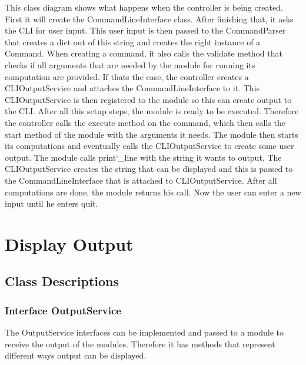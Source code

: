\documentclass[parskip=full]{scrartcl}
\begin{document}
\begin{figure}[h]
\begin{center}

\label{Controller Sequence Diagram}
\end{center}
\end{figure}
\newpage

This class diagram shows what happens when the controller is being created.
First it will create the CommandLineInterface class.
After finishing that, it asks the \gls{CLI} for user input.
This user input is then passed to the CommandParser that creates a dict out of this string and creates the right instance of a Command.
When creating a command, it also calls the validate method that checks if all arguments that are needed by the module for running its computation are provided.
If thats the case, the controller creates a CLIOutputService and attaches the CommandLineInterface to it.
This CLIOutputService is then registered to the module so this can create output to the \gls{CLI}.
After all this setup steps, the module is ready to be executed.
Therefore the controller calls the execute method on the command, which then calls the start method of the module with the arguments it needs.
The module then starts its computations and eventually calls the CLIOutputService to create some user output.
The module calls print\char`_line with the string it wants to output.
The CLIOutputService creates the string that can be displayed and this is passed to the CommandLineInterface that is attached to CLIOutputService.
After all computations are done, the module returns his call.
Now the user can enter a new input until he enters quit.

\newpage

\section{Display Output}

\subsection{Class Descriptions}

\subsubsection{Interface OutputService}
The OutputService interfaces can be implemented and passed to a module to receive the output of the modules. 
Therefore it has methods that represent different ways output can be displayed. 
\end{document}
